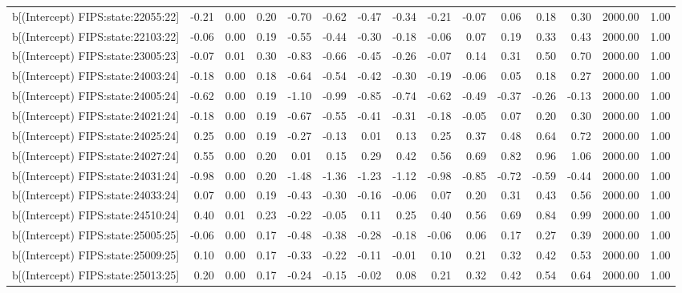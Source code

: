 \begin{table}[ht]
\begin{tabular}{rrrrrrrrrrrrrrr}
  b[(Intercept) FIPS:state:22055:22] & -0.21 & 0.00 & 0.20 & -0.70 & -0.62 & -0.47 & -0.34 & -0.21 & -0.07 & 0.06 & 0.18 & 0.30 & 2000.00 & 1.00 \\ 
  b[(Intercept) FIPS:state:22103:22] & -0.06 & 0.00 & 0.19 & -0.55 & -0.44 & -0.30 & -0.18 & -0.06 & 0.07 & 0.19 & 0.33 & 0.43 & 2000.00 & 1.00 \\ 
  b[(Intercept) FIPS:state:23005:23] & -0.07 & 0.01 & 0.30 & -0.83 & -0.66 & -0.45 & -0.26 & -0.07 & 0.14 & 0.31 & 0.50 & 0.70 & 2000.00 & 1.00 \\ 
  b[(Intercept) FIPS:state:24003:24] & -0.18 & 0.00 & 0.18 & -0.64 & -0.54 & -0.42 & -0.30 & -0.19 & -0.06 & 0.05 & 0.18 & 0.27 & 2000.00 & 1.00 \\ 
  b[(Intercept) FIPS:state:24005:24] & -0.62 & 0.00 & 0.19 & -1.10 & -0.99 & -0.85 & -0.74 & -0.62 & -0.49 & -0.37 & -0.26 & -0.13 & 2000.00 & 1.00 \\ 
  b[(Intercept) FIPS:state:24021:24] & -0.18 & 0.00 & 0.19 & -0.67 & -0.55 & -0.41 & -0.31 & -0.18 & -0.05 & 0.07 & 0.20 & 0.30 & 2000.00 & 1.00 \\ 
  b[(Intercept) FIPS:state:24025:24] & 0.25 & 0.00 & 0.19 & -0.27 & -0.13 & 0.01 & 0.13 & 0.25 & 0.37 & 0.48 & 0.64 & 0.72 & 2000.00 & 1.00 \\ 
  b[(Intercept) FIPS:state:24027:24] & 0.55 & 0.00 & 0.20 & 0.01 & 0.15 & 0.29 & 0.42 & 0.56 & 0.69 & 0.82 & 0.96 & 1.06 & 2000.00 & 1.00 \\ 
  b[(Intercept) FIPS:state:24031:24] & -0.98 & 0.00 & 0.20 & -1.48 & -1.36 & -1.23 & -1.12 & -0.98 & -0.85 & -0.72 & -0.59 & -0.44 & 2000.00 & 1.00 \\ 
  b[(Intercept) FIPS:state:24033:24] & 0.07 & 0.00 & 0.19 & -0.43 & -0.30 & -0.16 & -0.06 & 0.07 & 0.20 & 0.31 & 0.43 & 0.56 & 2000.00 & 1.00 \\ 
  b[(Intercept) FIPS:state:24510:24] & 0.40 & 0.01 & 0.23 & -0.22 & -0.05 & 0.11 & 0.25 & 0.40 & 0.56 & 0.69 & 0.84 & 0.99 & 2000.00 & 1.00 \\ 
  b[(Intercept) FIPS:state:25005:25] & -0.06 & 0.00 & 0.17 & -0.48 & -0.38 & -0.28 & -0.18 & -0.06 & 0.06 & 0.17 & 0.27 & 0.39 & 2000.00 & 1.00 \\ 
  b[(Intercept) FIPS:state:25009:25] & 0.10 & 0.00 & 0.17 & -0.33 & -0.22 & -0.11 & -0.01 & 0.10 & 0.21 & 0.32 & 0.42 & 0.53 & 2000.00 & 1.00 \\ 
  b[(Intercept) FIPS:state:25013:25] & 0.20 & 0.00 & 0.17 & -0.24 & -0.15 & -0.02 & 0.08 & 0.21 & 0.32 & 0.42 & 0.54 & 0.64 & 2000.00 & 1.00 \\ 

\end{tabular}
\end{table}
